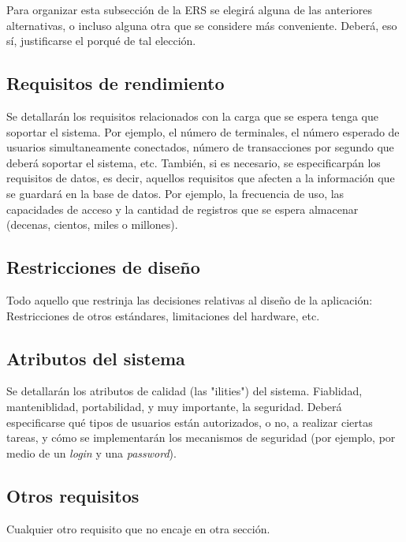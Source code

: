\documentclass[12pt,a4paper, twosite]{article}
\begin{document}
	
	Para organizar esta subsección de la ERS se elegirá alguna de las
	anteriores alternativas, o incluso alguna otra que se considere más
	conveniente. Deberá, eso sí, justificarse el porqué de tal elección.
	
	
	
	\subsection{Requisitos de rendimiento}
	\label{sec:org94bc543}
	
	Se detallarán los requisitos relacionados con la carga que se espera
	tenga que soportar el sistema. Por ejemplo, el número de terminales,
	el número esperado de usuarios simultaneamente conectados, número de
	transacciones por segundo que deberá soportar el sistema, etc.
	También, si es necesario, se especificarpán los requisitos de
	datos, es decir, aquellos requisitos que afecten a la información
	que se guardará en la base de datos. Por ejemplo, la frecuencia de
	uso, las capacidades de acceso y la cantidad de registros que se
	espera almacenar (decenas, cientos, miles o millones).
	
	
	\subsection{Restricciones de diseño}
	\label{sec:org49fe900}
	
	
	Todo aquello que restrinja las decisiones relativas al diseño de la
	aplicación: Restricciones de otros estándares, limitaciones del
	hardware, etc.
	
	
	\subsection{Atributos del sistema}
	\label{sec:orgd0babc0}
	
	Se detallarán los atributos de calidad (las "ilities") del
	sistema. Fiablidad, manteniblidad, portabilidad, y muy importante,
	la seguridad. Deberá especificarse qué tipos de usuarios están
	autorizados, o no, a realizar ciertas tareas, y cómo se
	implementarán los mecanismos de seguridad (por ejemplo, por medio de
	un \emph{login} y una \emph{password}).
	
	
	\subsection{Otros requisitos}
	\label{sec:org31d2978}
	
	Cualquier otro requisito que no encaje en otra sección.
	
\end{document}
